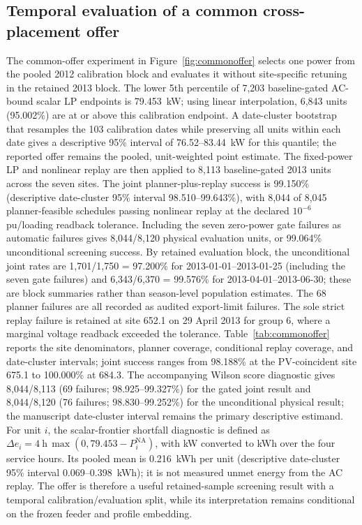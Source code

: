 \documentclass[11pt]{article}
\begin{document}
\subsection{Temporal evaluation of a common cross-placement offer}
The common-offer experiment in Figure~\ref{fig:commonoffer} selects one power from the pooled 2012 calibration block and evaluates it without site-specific retuning in the retained 2013 block. The lower 5th percentile of 7,203 baseline-gated AC-bound scalar LP endpoints is 79.453~kW; using linear interpolation, 6,843 units (95.002\%) are at or above this calibration endpoint. A date-cluster bootstrap that resamples the 103 calibration dates while preserving all units within each date gives a descriptive 95\% interval of 76.52--83.44~kW for this quantile; the reported offer remains the pooled, unit-weighted point estimate. The fixed-power LP and nonlinear replay are then applied to 8,113 baseline-gated 2013 units across the seven sites. The joint planner-plus-replay success is 99.150\% (descriptive date-cluster 95\% interval 98.510--99.643\%), with 8,044 of 8,045 planner-feasible schedules passing nonlinear replay at the declared $10^{-6}$ pu/loading readback tolerance. Including the seven zero-power gate failures as automatic failures gives 8,044/8,120 physical evaluation units, or 99.064\% unconditional screening success. By retained evaluation block, the unconditional joint rates are 1,701/1,750 = 97.200\% for 2013-01-01--2013-01-25 (including the seven gate failures) and 6,343/6,370 = 99.576\% for 2013-04-01--2013-06-30; these are block summaries rather than season-level population estimates. The 68 planner failures are all recorded as audited export-limit failures. The sole strict replay failure is retained at site 652.1 on 29 April 2013 for group 6, where a marginal voltage readback exceeded the tolerance. Table~\ref{tab:commonoffer} reports the site denominators, planner coverage, conditional replay coverage, and date-cluster intervals; joint success ranges from 98.188\% at the PV-coincident site 675.1 to 100.000\% at 684.3. The accompanying Wilson score diagnostic gives 8,044/8,113 (69 failures; 98.925--99.327\%) for the gated joint result and 8,044/8,120 (76 failures; 98.830--99.252\%) for the unconditional physical result; the manuscript date-cluster interval remains the primary descriptive estimand. For unit $i$, the scalar-frontier shortfall diagnostic is defined as \(\Delta e_i=4~\mathrm{h}\,\max(0,79.453-P^{\mathrm{NA}}_i)\), with kW converted to kWh over the four service hours. Its pooled mean is 0.216~kWh per unit (descriptive date-cluster 95\% interval 0.069--0.398~kWh); it is not measured unmet energy from the AC replay. The offer is therefore a useful retained-sample screening result with a temporal calibration/evaluation split, while its interpretation remains conditional on the frozen feeder and profile embedding.
\end{document}

